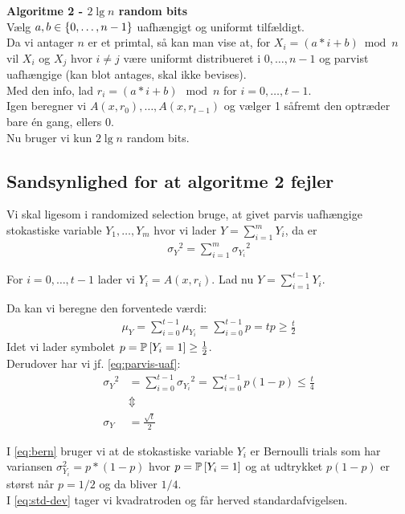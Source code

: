 \textbf{Algoritme 2 - $2 \lg n$ random bits}\\
Vælg $a, b \in \curly{0, \dots, n-1}$ uafhængigt og uniformt tilfældigt.\\

Da vi antager $n$ er et primtal, så kan man vise at, for $X_i = (a * i + b) \bmod n$ vil $X_i$ og $X_j$ hvor $i \neq j$ være uniformt distribueret i $0, \dots, n-1$ og parvist uafhængige (kan blot antages, skal ikke bevises).\\

Med den info, lad $r_i = (a * i + b) \mod n$ for $i = 0, \dots, t-1$.\\
Igen beregner vi $A(x, r_0), \dots, A(x, r_{t-1})$ og vælger 1 såfremt den optræder bare én gang, ellers 0.\\

Nu bruger vi kun $2 \lg n$ random bits.

\subsection{Sandsynlighed for at algoritme 2 fejler}
Vi skal ligesom i randomized selection bruge, at givet parvis uafhængige stokastiske variable $Y_1, \dots, Y_m$ hvor vi lader $Y = \sum_{i=1}^m Y_i$, da er
\begin{align}
  {\sigma_Y}^2 = \sum_{i=1}^m {\sigma_{Y_i}}^2 \label{eq:parvis-uaf}
\end{align}\vspace{2em}

For $i = 0, \dots, t-1$ lader vi $Y_i = A(x, r_i)$. Lad nu $Y = \sum_{i=1}^{t-1} Y_i$.

Da kan vi beregne den forventede værdi:
\begin{align}
  \mu_Y = \sum_{i=0}^{t-1} \mu_{Y_i} = \sum_{i=0}^{t-1} p = tp \geq \frac{t}{2} \label{eq:mu-y-ulighed}
\end{align}
Idet vi lader symbolet $p = \P{Y_i = 1} \geq \frac{1}{2}$.\\

Derudover har vi jf. \cref{eq:parvis-uaf}:
\begin{align}
  {\sigma_Y}^2
  &= \sum_{i=0}^{t-1} {\sigma_{Y_i}}^2
  = \sum_{i=0}^{t-1} p(1-p)
  \leq \frac{t}{4} \label{eq:bern} \\
  &\Updownarrow \nonumber  \\
  \sigma_Y &= \frac{\sqrt{t}}{2}  \label{eq:std-dev}
\end{align}

I \cref{eq:bern} bruger vi at de stokastiske variable $Y_i$ er Bernoulli trials som har variansen $\sigma_{Y_i}^2 = p*(1-p)$ hvor $p = \P{Y_i = 1}$ og at udtrykket $p(1 - p)$ er størst når $p = 1/2$ og da bliver $1/4$.\\
I \cref{eq:std-dev} tager vi kvadratroden og får herved standardafvigelsen.


